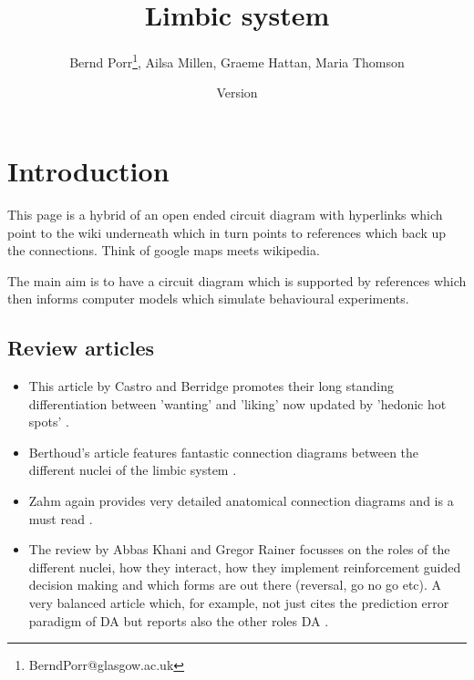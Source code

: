 \documentclass[12pt,a4paper]{article}
\title{Limbic system}
\author{Bernd Porr\footnote{BerndPorr@glasgow.ac.uk}, Ailsa Millen, Graeme Hattan, Maria Thomson}
\date{Version }
\let\oldsection\section
\renewcommand\section{\clearpage\oldsection}
\begin{document}
\ifx\HCode\undefined \else
{}
\fi


\maketitle

\ifx\HCode\undefined \else
{}
\fi


\section{Introduction}
This page is a hybrid of an open ended circuit diagram with hyperlinks which point to the wiki underneath which in turn points to references which back up the connections. Think of google maps meets wikipedia.

The main aim is to have a circuit diagram which is supported by references which then informs computer models which simulate behavioural experiments.


\subsection{Review articles}
\begin{itemize}
\item This article by Castro and Berridge promotes their long standing differentiation between 'wanting' and 'liking' \citep{Berridge2009} now updated by 'hedonic hot spots' \citep{Castro2015}.
\item Berthoud's article features fantastic connection diagrams between the different nuclei of the limbic system \citep{Berthoud04}.
\item Zahm again provides very detailed anatomical connection diagrams and is a must read \citep{Zahm00}.
\item The review by  Abbas Khani and Gregor Rainer focusses on the roles of the different nuclei, how they interact, how they implement reinforcement guided decision making and which forms are out there (reversal, go no go etc). A very balanced article which, for example, not just cites the prediction error paradigm of DA but reports also the other roles DA \citep{Khani2016}.
\end{itemize}

\tableofcontents
\end{document}
